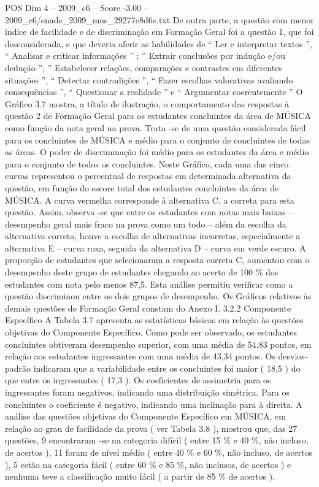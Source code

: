 \begin{textsample}{POS Dim 4 – 2009\_c6 – Score -3.00 – 2009\_c6/enade\_2009\_mus\_29277e8d6e.txt}
De outra parte, a questão com menor índice de facilidade e de discriminação em Formação Geral foi a questão 1, que foi desconsiderada, e que deveria aferir as habilidades de “ Ler e interpretar textos ”, “ Analisar e criticar informações ” ; ” Extrair conclusões por indução e/ou dedução ”, ” Estabelecer relações, comparações e contrastes em diferentes situações ”, “ Detectar contradições ”, “ Fazer escolhas valorativas avaliando consequências ”, “ Questionar a realidade ” e “ Argumentar coerentemente ” O Gráfico 3.7 mostra, a título de ilustração, o comportamento das respostas à questão 2 de Formação Geral para os estudantes concluintes da área de MÚSICA como função da nota geral na prova.
Trata -se de uma questão considerada fácil para os concluintes de MÚSICA e médio para o conjunto de concluintes de todas as áreas.
O poder de discriminação foi médio para os estudantes da área e médio para o conjunto de todos os concluintes.
Neste Gráfico, cada uma das cinco curvas representou o percentual de respostas em determinada alternativa da questão, em função do escore total dos estudantes concluintes da área de MÚSICA.
A curva vermelha corresponde à alternativa C, a correta para esta questão.
Assim, observa -se que entre os estudantes com notas mais baixas – desempenho geral mais fraco na prova como um todo – além da escolha da alternativa correta, houve a escolha de alternativas incorretas, especialmente a alternativa E – curva roxa, seguida da alternativa D – curva em verde escuro.
A proporção de estudantes que selecionaram a resposta correta C, aumentou com o desempenho deste grupo de estudantes chegando ao acerto de 100 \% dos estudantes com nota pelo menos 87,5.
Esta análise permitiu verificar como a questão discriminou entre os dois grupos de desempenho.
Os Gráficos relativos às demais questões de Formação Geral constam do Anexo I. 3.2.2 Componente Específico A Tabela 3.7 apresenta as estatísticas básicas em relação às questões objetivas do Componente Específico.
Como pode ser observado, os estudantes concluintes obtiveram desempenho superior, com uma média de 54,83 pontos, em relação aos estudantes ingressantes com uma média de 43,34 pontos.
Os desvios-padrão indicaram que a variabilidade entre os concluintes foi maior ( 18,5 ) do que entre os ingressantes ( 17,3 ).
Os coeficientes de assimetria para os ingressantes foram negativos, indicando uma distribuição simétrica.
Para os concluintes o coeficiente é negativo, indicando uma inclinação para à direita.
A análise das questões objetivas do Componente Específico em MÚSICA, em relação ao grau de facilidade da prova ( ver Tabela 3.8 ), mostrou que, das 27 questões, 9 encontraram -se na categoria difícil ( entre 15 \% e 40 \%, não incluso, de acertos ), 11 foram de nível médio ( entre 40 \% e 60 \%, não incluso, de acertos ), 5 estão na categoria fácil ( entre 60 \% e 85 \%, não inclusos, de acertos ) e nenhuma teve a classificação muito fácil ( a partir de 85 \% de acertos ).

\end{textsample}
